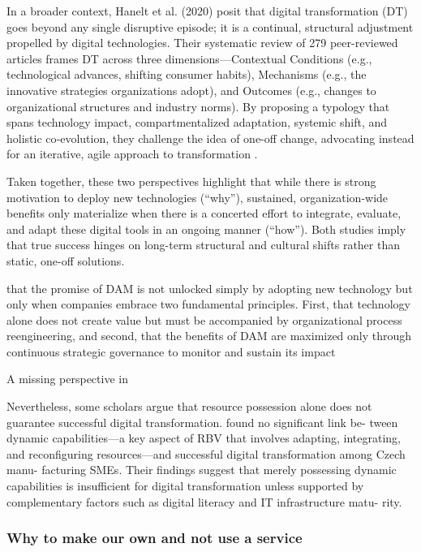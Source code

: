\documentclass[a4paper,10pt,twocolumn]{article}
\numberwithin{figure}{section}
\numberwithin{table}{section}
\begin{document}
 In a broader context, Hanelt et al. (2020) posit that digital transformation (DT) goes beyond 
any single disruptive episode; it is a continual, structural adjustment propelled by digital 
technologies. Their systematic review of 279 peer-reviewed articles frames DT across three 
dimensions—Contextual Conditions (e.g., technological advances, shifting consumer habits), 
Mechanisms (e.g., the innovative strategies organizations adopt), and Outcomes 
(e.g., changes to organizational structures and industry norms). By proposing 
a typology that spans technology impact, compartmentalized adaptation, systemic 
shift, and holistic co‐evolution, they challenge the idea of one-off change, 
advocating instead for an iterative, agile approach to transformation \citep{Haneltarticle}.

Taken together, these two perspectives highlight that while there is strong motivation to 
deploy new technologies (“why”), sustained, organization-wide benefits only materialize 
when there is a concerted effort to integrate, evaluate, and adapt these digital tools 
in an ongoing manner (“how”). Both studies imply that true success hinges on long-term 
structural and cultural shifts rather than static, one-off solutions.

\vspace{0.3cm}

that the promise of DAM
is not unlocked simply by adopting new technology but only when companies embrace two 
fundamental principles. First, that technology alone does not create value but must be accompanied by 
organizational process reengineering, and second, that the benefits of DAM 
are maximized only through continuous strategic governance to monitor and sustain its impact 


A missing perspective in

Nevertheless, some scholars argue that
resource possession alone does not guarantee successful 
digital transformation. 
\cite{Civelek2023} found no significant link be-
tween dynamic capabilities—a key aspect
of RBV that involves adapting, integrating,
and reconfiguring resources—and successful
digital transformation among Czech manu-
facturing SMEs. Their findings suggest that
merely possessing dynamic capabilities is
insufficient for digital transformation unless
supported by complementary factors such as
digital literacy and IT infrastructure matu-
rity.


\vspace{0.3cm}
\subsubsection{Why to make our own and not use a service}
\vspace{0.3cm}
\end{document}
